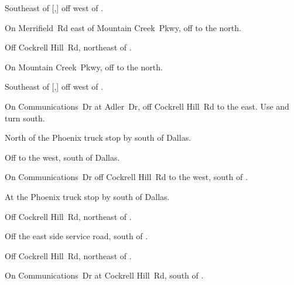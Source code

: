 
\begin{LocationList}

Southeast of [,] off  west of  .

On Merrifield~Rd east of Mountain Creek~Pkwy, off   to the north.

Off Cockrell Hill~Rd, northeast of  .

On Mountain Creek~Pkwy, off   to the north.

Southeast of [,] off  west of  .

On Communications~Dr at Adler~Dr, off Cockrell Hill~Rd to the east.
Use   and turn south.

\Location{\GarageHQ \Garage}
North of the Phoenix truck stop by   south of Dallas.

Off   to the west, south of Dallas.

On Communications~Dr off Cockrell Hill~Rd to the west, south of  .

At the Phoenix truck stop by   south of Dallas.

\Location{\RecruitmentAgency \Recruitment}
Off Cockrell Hill~Rd, northeast of  .

Off the east side  service road, south of .

Off Cockrell Hill~Rd, northeast of  .

On Communications~Dr at Cockrell Hill~Rd, south of  .

\end{LocationList}
